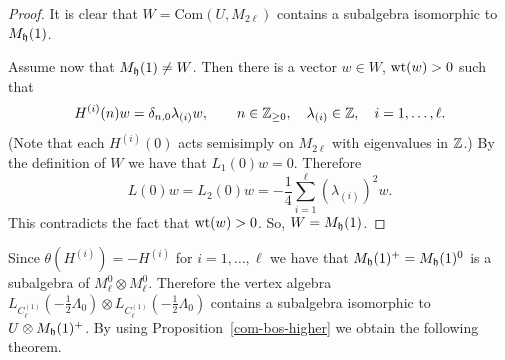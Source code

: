 \documentclass[11pt]{article}
\newcommand{\Z}{\Bbb Z}
\newcommand{\Zp} {\Z _ {\ge 0} }
\newcommand{\1}{\bf 1}
\newcommand{\wt}{{\rm {wt} }   }
\begin{document}
\begin{proof}
It is clear that
 $W= \mbox{Com} ( U, M_{2\ell})$ contains a subalgebra isomorphic to $M_{\frak h}
(1)$.

Assume now that $M_{\frak h} (1) \ne W$. Then there is a vector
$ w \in W$, ${\wt} (w) > 0$ such that
\[ H ^{(i)}(n) w =  \delta_{n,0} \lambda _{(i)} w, \qquad n \in {\Zp},
\quad \lambda _{(i)} \in {\Z}, \quad i = 1, \dots, \ell.
\]
(Note that each  $H^{(i)}(0)$ acts semisimply on $M_{2\ell}$ with
eigenvalues in ${\Z}$.)
By the def\/inition of $W$ we have that $L_1 (0) w = 0$. Therefore
\[ L(0) w = L_2(0) w = - \frac{1}{4} \sum_{i = 1 } ^{\ell} (\lambda
_{(i)})  ^2 w. \] This contradicts the fact that $\wt (w) > 0$. So,
$W= M_{\frak h} (1)$.
\end{proof}


Since $\theta (H^{(i)}) = -H^{(i)}$ for $i=1, \dots, \ell$ we have
that $M_{\frak h} (1)^+ =M_{\frak h}(1) ^0$ is a subalgebra of
$M_{\ell} ^0 \otimes M_{\ell} ^0$.
 Therefore the  vertex algebra $L_{C_{\ell} ^{(1)}}(-\tfrac{1}{2}\Lambda_0) \otimes L_{C_{\ell} ^{(1)}}(-\tfrac{1}{2}\Lambda_0)$ contains a subalgebra isomorphic
to $U \otimes M_{\frak h} (1) ^+$. By using Proposition~\ref{com-bos-higher} we obtain the following theorem.
\end{document}
